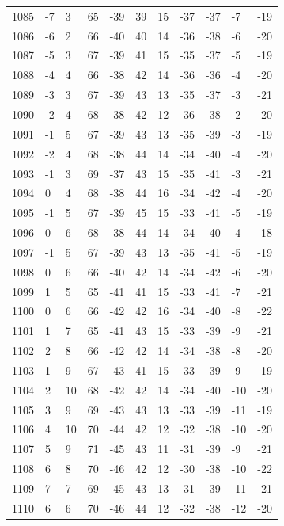 \begin{table}[H]
\begin{tabular}{lllllllllll}
1085 & -7 & 3 & 65 & -39 & 39 & 15 & -37 & -37 & -7 & -19 \\
1086 & -6 & 2 & 66 & -40 & 40 & 14 & -36 & -38 & -6 & -20 \\
1087 & -5 & 3 & 67 & -39 & 41 & 15 & -35 & -37 & -5 & -19 \\
1088 & -4 & 4 & 66 & -38 & 42 & 14 & -36 & -36 & -4 & -20 \\
1089 & -3 & 3 & 67 & -39 & 43 & 13 & -35 & -37 & -3 & -21 \\
1090 & -2 & 4 & 68 & -38 & 42 & 12 & -36 & -38 & -2 & -20 \\
1091 & -1 & 5 & 67 & -39 & 43 & 13 & -35 & -39 & -3 & -19 \\
1092 & -2 & 4 & 68 & -38 & 44 & 14 & -34 & -40 & -4 & -20 \\
1093 & -1 & 3 & 69 & -37 & 43 & 15 & -35 & -41 & -3 & -21 \\
1094 & 0 & 4 & 68 & -38 & 44 & 16 & -34 & -42 & -4 & -20 \\
1095 & -1 & 5 & 67 & -39 & 45 & 15 & -33 & -41 & -5 & -19 \\
1096 & 0 & 6 & 68 & -38 & 44 & 14 & -34 & -40 & -4 & -18 \\
1097 & -1 & 5 & 67 & -39 & 43 & 13 & -35 & -41 & -5 & -19 \\
1098 & 0 & 6 & 66 & -40 & 42 & 14 & -34 & -42 & -6 & -20 \\
1099 & 1 & 5 & 65 & -41 & 41 & 15 & -33 & -41 & -7 & -21 \\
1100 & 0 & 6 & 66 & -42 & 42 & 16 & -34 & -40 & -8 & -22 \\
1101 & 1 & 7 & 65 & -41 & 43 & 15 & -33 & -39 & -9 & -21 \\
1102 & 2 & 8 & 66 & -42 & 42 & 14 & -34 & -38 & -8 & -20 \\
1103 & 1 & 9 & 67 & -43 & 41 & 15 & -33 & -39 & -9 & -19 \\
1104 & 2 & 10 & 68 & -42 & 42 & 14 & -34 & -40 & -10 & -20 \\
1105 & 3 & 9 & 69 & -43 & 43 & 13 & -33 & -39 & -11 & -19 \\
1106 & 4 & 10 & 70 & -44 & 42 & 12 & -32 & -38 & -10 & -20 \\
1107 & 5 & 9 & 71 & -45 & 43 & 11 & -31 & -39 & -9 & -21 \\
1108 & 6 & 8 & 70 & -46 & 42 & 12 & -30 & -38 & -10 & -22 \\
1109 & 7 & 7 & 69 & -45 & 43 & 13 & -31 & -39 & -11 & -21 \\
1110 & 6 & 6 & 70 & -46 & 44 & 12 & -32 & -38 & -12 & -20 \\

\end{tabular}
\end{table}
